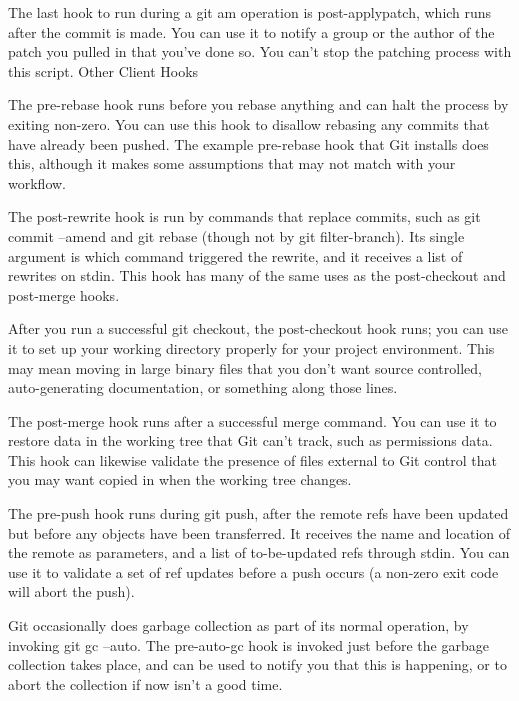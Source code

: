 The last hook to run during a git am operation is post-applypatch, which runs after the commit is made. You can use it to notify a group or the author of the patch you pulled in that you’ve done so. You can’t stop the patching process with this script.
Other Client Hooks

The pre-rebase hook runs before you rebase anything and can halt the process by exiting non-zero. You can use this hook to disallow rebasing any commits that have already been pushed. The example pre-rebase hook that Git installs does this, although it makes some assumptions that may not match with your workflow.

The post-rewrite hook is run by commands that replace commits, such as git commit --amend and git rebase (though not by git filter-branch). Its single argument is which command triggered the rewrite, and it receives a list of rewrites on stdin. This hook has many of the same uses as the post-checkout and post-merge hooks.

After you run a successful git checkout, the post-checkout hook runs; you can use it to set up your working directory properly for your project environment. This may mean moving in large binary files that you don’t want source controlled, auto-generating documentation, or something along those lines.

The post-merge hook runs after a successful merge command. You can use it to restore data in the working tree that Git can’t track, such as permissions data. This hook can likewise validate the presence of files external to Git control that you may want copied in when the working tree changes.

The pre-push hook runs during git push, after the remote refs have been updated but before any objects have been transferred. It receives the name and location of the remote as parameters, and a list of to-be-updated refs through stdin. You can use it to validate a set of ref updates before a push occurs (a non-zero exit code will abort the push).

Git occasionally does garbage collection as part of its normal operation, by invoking git gc --auto. The pre-auto-gc hook is invoked just before the garbage collection takes place, and can be used to notify you that this is happening, or to abort the collection if now isn’t a good time.
